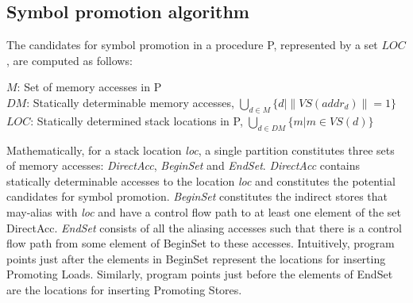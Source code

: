 \subsection{Symbol promotion algorithm}
The candidates for symbol promotion in a procedure P, represented by a set $LOC$, are computed as follows:\\
{\begin{scriptsize}
				 $M$: Set of memory accesses in P\\
				 $DM$: Statically determinable memory accesses, $\bigcup_{d \in M}\{ d | \| VS(addr_{d})\| = 1\}$\\
				 $LOC$: Statically determined stack locations in P, $\bigcup_{d \in DM}\{m | m \in VS(d)\}$\\
 \end{scriptsize}}

Mathematically, for a stack location \emph{loc}, a single partition constitutes three sets of memory accesses: \emph{DirectAcc}, \emph{BeginSet} and \emph{EndSet}. \emph{DirectAcc} contains statically determinable accesses to the location \emph{loc} and constitutes the potential candidates for symbol promotion. \emph{BeginSet} constitutes the indirect stores that may-alias with \emph{loc} and have a control flow path to at least one element of the set DirectAcc. \emph{EndSet} consists of all the aliasing accesses such that there is a control flow path from some element of BeginSet to these accesses. Intuitively, program points just after the elements in BeginSet represent the locations for inserting Promoting Loads. Similarly, program points just before the elements of EndSet are the locations for inserting Promoting Stores. %


